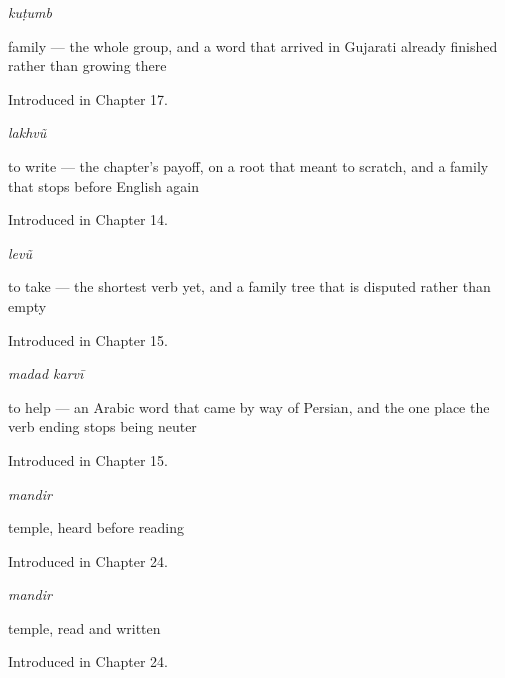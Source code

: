\noindent\begin{minipage}[t]{\linewidth}
\raggedright
\textbf{}\enspace\emph{kuṭumb}\par
\small family — the whole group, and a word that arrived in Gujarati already finished rather than growing there\par
\footnotesize Introduced in Chapter 17.
\end{minipage}\par\medskip

\noindent\begin{minipage}[t]{\linewidth}
\raggedright
\textbf{}\enspace\emph{lakhvũ}\par
\small to write — the chapter's payoff, on a root that meant to scratch, and a family that stops before English again\par
\footnotesize Introduced in Chapter 14.
\end{minipage}\par\medskip

\noindent\begin{minipage}[t]{\linewidth}
\raggedright
\textbf{}\enspace\emph{levũ}\par
\small to take — the shortest verb yet, and a family tree that is disputed rather than empty\par
\footnotesize Introduced in Chapter 15.
\end{minipage}\par\medskip

\noindent\begin{minipage}[t]{\linewidth}
\raggedright
\textbf{ }\enspace\emph{madad karvī}\par
\small to help — an Arabic word that came by way of Persian, and the one place the verb ending stops being neuter\par
\footnotesize Introduced in Chapter 15.
\end{minipage}\par\medskip

\noindent\begin{minipage}[t]{\linewidth}
\raggedright
\textbf{}\enspace\emph{mandir}\par
\small temple, heard before reading\par
\footnotesize Introduced in Chapter 24.
\end{minipage}\par\medskip

\noindent\begin{minipage}[t]{\linewidth}
\raggedright
\textbf{}\enspace\emph{mandir}\par
\small temple, read and written\par
\footnotesize Introduced in Chapter 24.
\end{minipage}\par\medskip

